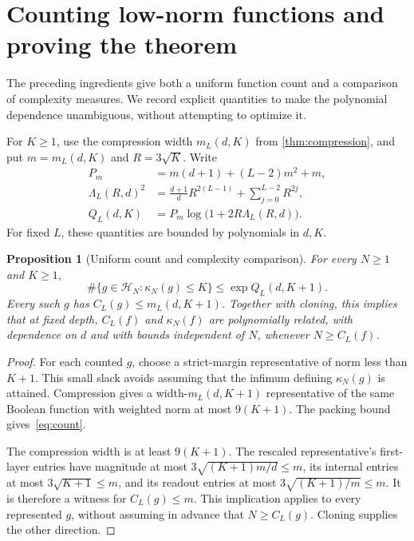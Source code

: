 \documentclass[11pt]{article}
\newtheorem{proposition}[theorem]{Proposition}
\theoremstyle{definition}
\newcommand{\cH}{\mathcal H}
\begin{document}
\section{Counting low-norm functions and proving the theorem}\label{sec:counting}
The preceding ingredients give both a uniform function count and a comparison of complexity measures. We record explicit quantities to make the polynomial dependence unambiguous, without attempting to optimize it.

For $K\geq1$, use the compression width $m_L(d,K)$ from \cref{thm:compression}, and put $m=m_L(d,K)$ and $R=3\sqrt K$. Write
\begin{equation}\label{eq:Q}
 \begin{split}
 P_m&=m(d+1)+(L-2)m^2+m,\\
 \Lambda_L(R,d)^2&=\frac{d+1}{d}R^{2(L-1)}+\sum_{j=0}^{L-2}R^{2j},\\
 Q_L(d,K)&=P_m\log\bigl(1+2R\Lambda_L(R,d)\bigr).
 \end{split}
\end{equation}
For fixed $L$, these quantities are bounded by polynomials in $d,K$.

\begin{proposition}[Uniform count and complexity comparison]\label{prop:count}
For every $N\geq1$ and $K\geq1$,
\begin{equation}\label{eq:count}
 \#\{g\in\cH_N:\kappa_N(g)\leq K\}\leq\exp Q_L(d,K+1).
\end{equation}
Every such $g$ has $C_L(g)\leq m_L(d,K+1)$. Together with cloning, this implies that at fixed depth, $C_L(f)$ and $\kappa_N(f)$ are polynomially related, with dependence on $d$ and with bounds independent of $N$, whenever $N\geq C_L(f)$.
\end{proposition}
\begin{proof}
For each counted $g$, choose a strict-margin representative of norm less than $K+1$. This small slack avoids assuming that the infimum defining $\kappa_N(g)$ is attained. Compression gives a width-$m_L(d,K+1)$ representative of the same Boolean function with weighted norm at most $9(K+1)$. The packing bound gives~\eqref{eq:count}.

The compression width is at least $9(K+1)$. The rescaled representative's first-layer entries have magnitude at most $3\sqrt{(K+1)m/d}\leq m$, its internal entries at most $3\sqrt{K+1}\leq m$, and its readout entries at most $3\sqrt{(K+1)/m}\leq m$. It is therefore a witness for $C_L(g)\leq m$. This implication applies to every represented $g$, without assuming in advance that $N\geq C_L(g)$. Cloning supplies the other direction.
\end{proof}
\end{document}
